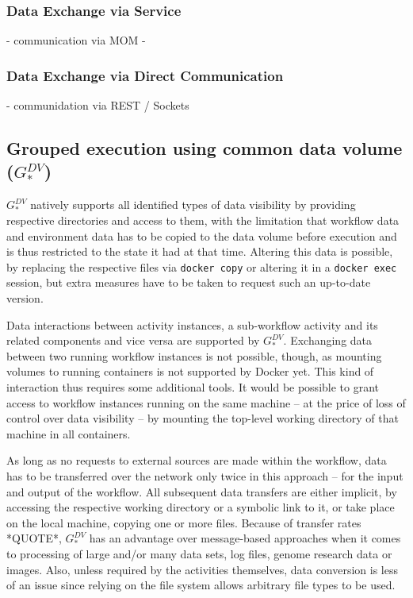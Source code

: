   \subsubsection{Data Exchange via Service} %
  \label{ssub:data_exchange_via_service}
    - communication via MOM
    -

  \subsubsection{Data Exchange via Direct Communication} %
  \label{ssub:data_exchange_via_direct_communication}
    - communidation via REST / Sockets


\subsection[Grouped execution using common data volume]{Grouped execution using common data volume ($G_{*}^{DV}$)} %
\label{sub:grouped_execution_using_common_data_volume}

  $G_{*}^{DV}$ natively supports all identified types of data visibility by providing respective directories and access to them, with the limitation that workflow data and environment data has to be copied to the data volume before execution and is thus restricted to the state it had at that time. Altering this data is possible, \eg by replacing the respective files via \texttt{docker copy} or altering it in a \texttt{docker exec} session, but extra measures have to be taken to request such an up-to-date version.

  Data interactions between activity instances, a sub-workflow activity and its related components and vice versa are supported by $G_{*}^{DV}$. Exchanging data between two running workflow instances is not possible, though, as mounting volumes to running containers is not supported by Docker yet. This kind of interaction thus requires some additional tools. It would be possible to grant access to workflow instances running on the same machine -- at the price of loss of control over data visibility -- by mounting the top-level working directory of that machine in all containers.

  As long as no requests to external sources are made within the workflow, data has to be transferred over the network only twice in this approach -- for the input and output of the workflow. All subsequent data transfers are either implicit, \eg by accessing the respective working directory or a symbolic link to it, or take place on the local machine, \eg copying one or more files. Because of transfer rates *QUOTE*, $G_{*}^{DV}$ has an advantage over message-based approaches when it comes to processing of large and/or many data sets, \ie log files, genome research data or images. Also, unless required by the activities themselves, data conversion is less of an issue since relying on the file system allows arbitrary file types to be used.

